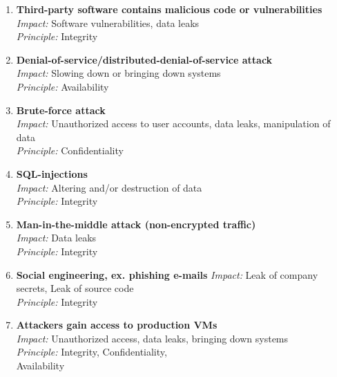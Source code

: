 \begin{multicols}{2}
\begin{enumerate}

    \item \textbf{Third-party software contains malicious code or vulnerabilities}\\
    \textit{Impact:} Software vulnerabilities, data leaks \\ 
    \textit{Principle:} Integrity\\

    \item \textbf{Denial-of-service/distributed-denial-of-service attack}\\
    \textit{Impact:} Slowing down or bringing down systems \\ 
    \textit{Principle:} Availability\\

    \item \textbf{Brute-force attack}\\
    \textit{Impact:} Unauthorized access to user accounts, data leaks, manipulation of data \\
    \textit{Principle:} Confidentiality\\

    \item \textbf{SQL-injections}\\
    \textit{Impact:} Altering and/or destruction of data \\
    \textit{Principle:} Integrity

    \columnbreak
    
    \item \textbf{Man-in-the-middle attack (non-encrypted traffic)}\\
    \textit{Impact:} Data leaks \\
    \textit{Principle:} Integrity\\

    \item \textbf{Social engineering, ex. phishing e-mails}
    \textit{Impact:} Leak of company secrets, Leak of source code \\
    \textit{Principle:} Integrity\\

    \item \textbf{Attackers gain access to production VMs}\\
    \textit{Impact:} Unauthorized access, data leaks, bringing down systems \\
    \textit{Principle:} Integrity, Confidentiality,\\ Availability\\

\end{enumerate}
\end{multicols}

